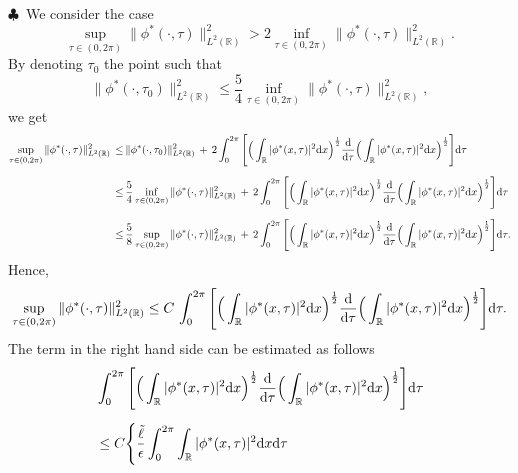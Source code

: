 \documentclass[10pt, reqno]{amsart}
\numberwithin{equation}{section}
\theoremstyle{definition}
\newcommand{\R}{\mathbb R}
\def\R{{\mathfrak R}}
\def\R{\Bbb R}
\begin{document}
{\begin{appendix}
\smallskip
\noindent $\clubsuit$\
We consider the case
$$
\sup_{\tau\in (0, 2\pi)} \|\phi^*(\cdot, \tau)\|^2_{L^2({\mathbb R})} > 2\inf_{\tau\in (0, 2\pi)} \|\phi^*(\cdot, \tau)\|^2_{L^2({\mathbb R})} .
$$
By denoting $\tau_0$ the  point  such that
\begin{equation*}
 \|\phi^*(\cdot, \tau_0)\|^2_{L^2({\mathbb R})} \leq \frac{5}{4}\inf_{\tau\in (0, 2\pi)} \|\phi^*(\cdot, \tau)\|^2_{L^2({\mathbb R})},
\end{equation*}
we get
\begin{align*}
\sup_{\tau\in (0, 2\pi)} \|\phi^*(\cdot, \tau)\|^2_{L^2({\mathbb R})}
\,\leq\,&
\|\phi^*(\cdot, \tau_0)\|^2_{L^2({\mathbb R})}
\,+\,2\int^{2\pi}_0 \Bigg[\Big(\int_{\R} |\phi^*(x, \tau)|^2  {\mathrm d} x \Big)^{\frac{1}{2}}
\frac{{\mathrm d}}{{\mathrm d} \tau}\Big(\int_{\R} |\phi^*(x, \tau)|^2  {\mathrm d} x \Big)^{\frac{1}{2}} \Bigg] {\mathrm d} \tau
\\[2mm]
\,\leq\,&
\frac{5}{4}\inf_{\tau\in (0, 2\pi)} \|\phi^*(\cdot, \tau)\|^2_{L^2({\mathbb R})}
\,+\,2\int^{2\pi}_0\Bigg[ \Big(\int_{\R} |\phi^*(x, \tau)|^2  {\mathrm d} x \Big)^{\frac{1}{2}}
\frac{{\mathrm d}}{{\mathrm d} \tau}\Big(\int_{\R} |\phi^*(x, \tau)|^2  {\mathrm d} x \Big)^{\frac{1}{2}} \Bigg] {\mathrm d} \tau
\\[2mm]
\,\leq\,&
\frac{5}{8}\sup_{\tau\in (0, 2\pi)} \|\phi^*(\cdot, \tau)\|^2_{L^2({\mathbb R})}
\,+\,2\int^{2\pi}_0 \Bigg[\Big(\int_{\R} |\phi^*(x, \tau)|^2  {\mathrm d} x \Big)^{\frac{1}{2}}
\frac{{\mathrm d}}{{\mathrm d} \tau}\Big(\int_{\R} |\phi^*(x, \tau)|^2  {\mathrm d} x \Big)^{\frac{1}{2}}\Bigg]  {\mathrm d} \tau.
\end{align*}
Hence,
\begin{align*}
\sup_{\tau\in (0, 2\pi)} \|\phi^*(\cdot, \tau)\|^2_{L^2({\mathbb R})}
\leq
C\,\int^{2\pi}_0\Bigg[ \Big(\int_{\R} |\phi^*(x, \tau)|^2  {\mathrm d} x \Big)^{\frac{1}{2}}
\frac{{\mathrm d}}{{\mathrm d} \tau}\Big(\int_{\R} |\phi^*(x, \tau)|^2  {\mathrm d} x \Big)^{\frac{1}{2}}\Bigg]  {\mathrm d} \tau.
\end{align*}
The term in the right hand side can be estimated as follows
\begin{align*}
&\int^{2\pi}_0\Bigg[ \Big(\int_{\R} |\phi^*(x, \tau)|^2  {\mathrm d} x \Big)^{\frac{1}{2}}
\frac{{\mathrm d}}{{\mathrm d} \tau}\Big(\int_{\R} |\phi^*(x, \tau)|^2  {\mathrm d} x \Big)^{\frac{1}{2}}\Bigg]  {\mathrm d} \tau
\nonumber\\[2mm]
&\le C \Bigg\{\frac{\tilde\ell}{\epsilon} \int_0^{2\pi} \int_{\R} |\phi^*(x, \tau)|^2  {\mathrm d} x {\mathrm d}\tau

\end{align*}
\end{appendix}}
\end{document}
